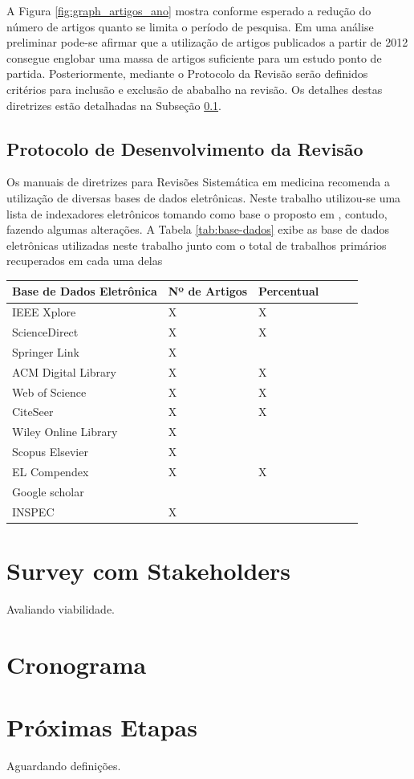 \documentclass{article}
\begin{document}
A Figura \ref{fig:graph_artigos_ano} mostra conforme esperado a
redução do número de artigos quanto se limita o período de
pesquisa. Em uma análise preliminar pode-se afirmar que a utilização
de artigos publicados a partir de 2012 consegue englobar uma massa de
artigos suficiente para um estudo ponto de partida. Posteriormente,
mediante o Protocolo da Revisão serão definidos critérios para
inclusão e exclusão de ababalho na revisão. Os detalhes destas
diretrizes estão detalhadas na Subseção \ref{subsec:protocol}.



\subsection{Protocolo de Desenvolvimento da Revisão}
\label{subsec:protocol}

Os manuais de diretrizes para Revisões Sistemática em medicina recomenda a
utilização de diversas bases de dados eletrônicas. Neste trabalho utilizou-se
uma lista de indexadores eletrônicos tomando como base o proposto em
\cite{brereton2007lessons,abebe2014trends}, contudo, fazendo algumas alterações. A Tabela \ref{tab:base-dados} exibe
as base de dados eletrônicas utilizadas neste trabalho junto com o total de
trabalhos primários recuperados em cada uma delas

\begin{center}
\begin{tabular}{llllll}
\label{tab:base-dados}
Base de Dados Eletrônica & Nº de Artigos & Percentual\\
\hline
IEEE Xplore  & X & X\\
ScienceDirect  & X & X \\
Springer Link & X & \\
ACM Digital Library & X & X \\
Web of Science & X & X \\
CiteSeer & X & X \\
Wiley Online Library & X & \\
Scopus Elsevier & X &  \\
EL Compendex & X & X \\
Google scholar &  & \\
INSPEC  & X &  \\
\end{tabular}
\end{center}

\section{Survey com Stakeholders}
\label{sec:survey}

Avaliando viabilidade.

\section{Cronograma}
\label{sec:cronograma}


\section{Próximas Etapas}
\label{sec:proximas_etapas}

Aguardando definições.

\medskip


\end{document}
